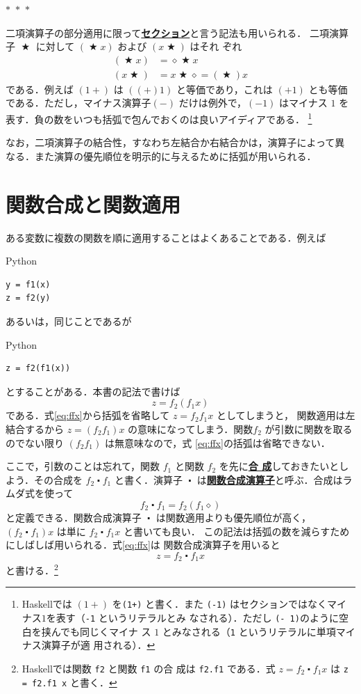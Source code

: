 \documentclass[a5paper,twoside,fleqn,draft]{jsbook}
\newcommand{\separator}{\begin{center}$*$~$*$~$*$\end{center}}
\newcommand{\programminglanguage}[1]{\textsf{#1}}
\newcommand{\haskell}{\programminglanguage{Haskell}}
\newcommand{\python}{\programminglanguage{Python}}
\newcommand{\keyword}[1]{{\underline{\textbf{#1}}}}
\newcommand{\code}[1]{\texttt{#1}}
\newenvironment{pythoncode}{\begin{itembox}[r]{\python}}{\end{itembox}}
\newcommand{\mAnonParam}{\diamond}
\DeclareMathOperator{\mBinOp}{\bigstar}
\DeclareMathOperator{\mComp}{\centerdot}
\begin{document}
\separator

二項演算子の部分適用に限って\keyword{セクション}と言う記法も用いられる．
二項演算子 $\mBinOp$ に対して $(\mBinOp x)$ および $(x\mBinOp)$ はそれ
ぞれ
\begin{align}
  (\mBinOp x)
  &=\mAnonParam\mBinOp x\\
  (x\mBinOp)
  &=x\mBinOp\mAnonParam=(\mBinOp)x
\end{align}
である．例えば $(1+)$ は $((+)1)$ と等価であり，これは $(+1)$ とも等価
である．ただし，マイナス演算子$(-)$ だけは例外で，$(-1)$ はマイナス
$1$ を表す．負の数をいつも括弧で包んでおくのは良いアイディアである．
\footnote{\haskell では $(1+)$ を\code{(1+)} と書く．また \code{(-1)}
  はセクションではなくマイナス$1$を表す（\code{-1} というリテラルとみ
    なされる）．ただし \code{(- 1)}のように空白を挟んでも同じくマイナ
  ス $1$ とみなされる（\code{1} というリテラルに単項マイナス演算子が適
    用される）．}

なお，二項演算子の結合性，すなわち左結合か右結合かは，演算子によって異
なる．また演算の優先順位を明示的に与えるために括弧が用いられる．

\section{関数合成と関数適用}

ある変数に複数の関数を順に適用することはよくあることである．例えば
\begin{pythoncode}
\begin{verbatim}
y = f1(x)
z = f2(y)
\end{verbatim}
\end{pythoncode}
あるいは，同じことであるが
\begin{pythoncode}
\begin{verbatim}
z = f2(f1(x))
\end{verbatim}
\end{pythoncode}
とすることがある．本書の記法で書けば
\begin{equation}
  \label{eq:ffx}
  z=
  f_2(f_1x)
\end{equation}
である．式\eqref{eq:ffx}から括弧を省略して $z=f_2f_1x$ としてしまうと，
関数適用は左結合するから $z=(f_2f_1)x$ の意味になってしまう．関数$f_2$
が引数に関数を取るのでない限り $(f_2f_1)$ は無意味なので，式
\eqref{eq:ffx}の括弧は省略できない．

ここで，引数のことは忘れて，関数 $f_1$ と関数 $f_2$ を先に\keyword{合
  成}しておきたいとしよう．その合成を $f_2\mComp f_1$ と書く．演算子
$\mComp$ は\keyword{関数合成演算子}と呼ぶ．合成はラムダ式を使って
\begin{equation}
  f_2\mComp f_1
  =f_2(f_1\mAnonParam)
\end{equation}
と定義できる．関数合成演算子 $\mComp$ は関数適用よりも優先順位が高く，
$\left(f_2\mComp f_1\right)x$ は単に $f_2\mComp f_1x$ と書いても良い．
この記法は括弧の数を減らすためにしばしば用いられる．式\eqref{eq:ffx}は
関数合成演算子を用いると
\begin{equation}
  z
  =f_2\mComp f_1x
\end{equation}
と書ける．\footnote{\haskell では関数 \code{f2} と関数 \code{f1} の合
  成は \code{f2.f1} である．式 $z=f_2\mComp f_1x$ は \code{z = f2.f1
    x} と書く．}
\end{document}
